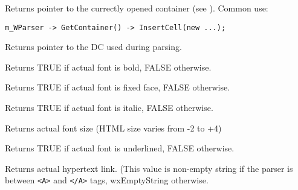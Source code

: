 
Returns pointer to the currectly opened container (see ).
Common use:

\begin{verbatim}
m_WParser -> GetContainer() -> InsertCell(new ...);
\end{verbatim}

\label{wxhtmlwinparsergetdc}


Returns pointer to the DC used during parsing.

\label{wxhtmlwinparsergetfontbold}


Returns TRUE if actual font is bold, FALSE otherwise.

\label{wxhtmlwinparsergetfontfixed}


Returns TRUE if actual font is fixed face, FALSE otherwise.

\label{wxhtmlwinparsergetfontitalic}


Returns TRUE if actual font is italic, FALSE otherwise.


\label{wxhtmlwinparsergetfontsize}


Returns actual font size (HTML size varies from -2 to +4)

\label{wxhtmlwinparsergetfontunderlined}


Returns TRUE if actual font is underlined, FALSE otherwise.

\label{wxhtmlwinparsergetlink}


Returns actual hypertext link. (This value is non-empty string
if the parser is between {\tt <A>} and {\tt </A>} tags,
wxEmptyString otherwise.


\label{wxhtmlwinparsergetlinkcolor}

